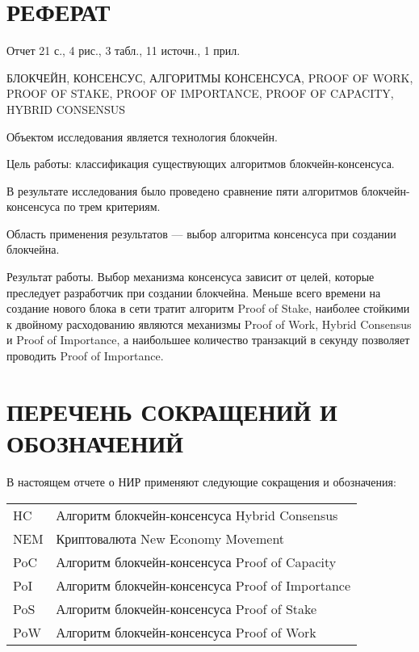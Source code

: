 \documentclass{bmstu}
\begin{document}


{\centering \chapter*{РЕФЕРАТ}}

Отчет 21 с., 4 рис., 3 табл., 11 источн., 1 прил.

\noindent БЛОКЧЕЙН, КОНСЕНСУС, АЛГОРИТМЫ КОНСЕНСУСА, PROOF OF WORK, PROOF OF STAKE, PROOF OF IMPORTANCE, PROOF OF CAPACITY, HYBRID CONSENSUS

Объектом исследования является технология блокчейн.

Цель работы: классификация существующих алгоритмов блокчейн-консенсуса.

В результате исследования было проведено сравнение пяти алгоритмов блокчейн-консенсуса по трем критериям.

Область применения результатов --- выбор алгоритма консенсуса при создании блокчейна.

Результат работы. 
Выбор механизма консенсуса зависит от целей, которые преследует разработчик при создании блокчейна. 
Меньше всего времени на создание нового блока в сети тратит алгоритм Proof of Stake, наиболее стойкими к двойному расходованию являются механизмы Proof of Work, Hybrid Consensus и Proof of Importance, а наибольшее количество транзакций в секунду позволяет проводить Proof of Importance.

\maketableofcontents

{\centering \chapter*{ПЕРЕЧЕНЬ СОКРАЩЕНИЙ И ОБОЗНАЧЕНИЙ}}

В настоящем отчете о НИР применяют следующие сокращения и обозначения:

\begin{table}[H]
\begin{tabular}{p{3cm}p{13.5cm}}
HC & Алгоритм блокчейн-консенсуса Hybrid Consensus
\tabularnewline
NEM & Криптовалюта New Economy Movement
\tabularnewline
PoC & Алгоритм блокчейн-консенсуса Proof of Capacity
\tabularnewline
PoI & Алгоритм блокчейн-консенсуса Proof of Importance
\tabularnewline
PoS & Алгоритм блокчейн-консенсуса Proof of Stake
\tabularnewline
PoW & Алгоритм блокчейн-консенсуса Proof of Work
\tabularnewline
\end{tabular}
\end{table}
\end{document}
